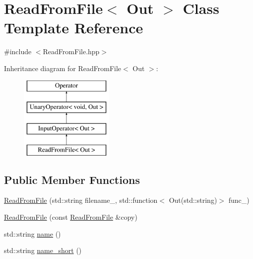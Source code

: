 \hypertarget{class_read_from_file}{\section{\-Read\-From\-File$<$ \-Out $>$ \-Class \-Template \-Reference}
\label{class_read_from_file}
}


{\ttfamily \#include $<$\-Read\-From\-File.\-hpp$>$}

\-Inheritance diagram for \-Read\-From\-File$<$ \-Out $>$\-:\begin{figure}[H]
\begin{center}
\leavevmode
\includegraphics[height=4.000000cm]{class_read_from_file}
\end{center}
\end{figure}
\subsection*{\-Public \-Member \-Functions}
\begin{DoxyCompactItemize}
\item 
\hyperlink{class_read_from_file_abe2865029ef79f9dd35e511892738dc8}{\-Read\-From\-File} (std\-::string filename\-\_\-, std\-::function$<$ \-Out(std\-::string)$>$ func\-\_\-)
\item 
\hyperlink{class_read_from_file_aecb083f7807d61a59bcfe3394d9aa808}{\-Read\-From\-File} (const \hyperlink{class_read_from_file}{\-Read\-From\-File} \&copy)
\item 
std\-::string \hyperlink{class_read_from_file_af509393aad1e80f25fee64991f365bbb}{name} ()
\item 
std\-::string \hyperlink{class_read_from_file_a58ff16dcafb4ad2039cf151fd7a0440f}{name\-\_\-short} ()
\end{DoxyCompactItemize}
